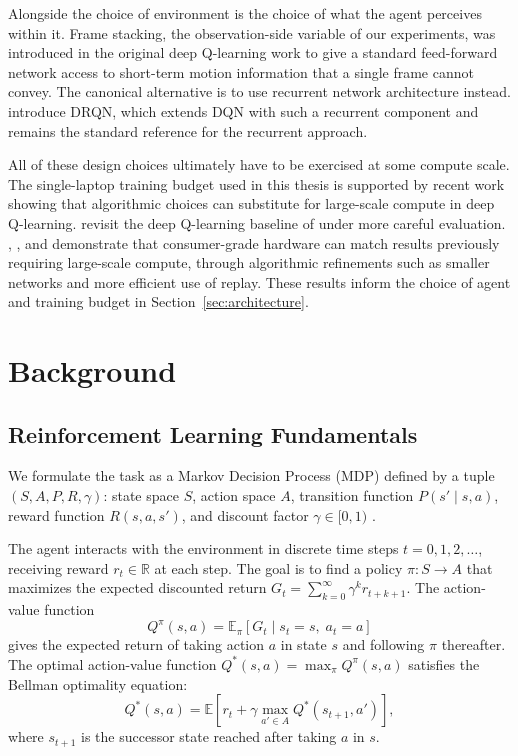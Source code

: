 \documentclass[12pt,a4paper,titlepage]{article}
\begin{document}
Alongside the choice of environment is the choice of what the agent perceives within it. Frame stacking, the observation-side variable of our experiments, was introduced in the original deep Q-learning work \citep{Mnih2013} to give a standard feed-forward network access to short-term motion information that a single frame cannot convey. The canonical alternative is to use recurrent network architecture instead. \citet{Hausknecht2015} introduce DRQN, which extends DQN with such a recurrent component and remains the standard reference for the recurrent approach.

All of these design choices ultimately have to be exercised at some compute scale. The single-laptop training budget used in this thesis is supported by recent work showing that algorithmic choices can substitute for large-scale compute in deep Q-learning. \citet{ObandoCeron2021} revisit the deep Q-learning baseline of \citet{Hessel2018} under more careful evaluation. \citet{Schwarzer2023}, \citet{ObandoCeron2023}, and \citet{Clark2024} demonstrate that consumer-grade hardware can match results previously requiring large-scale compute, through algorithmic refinements such as smaller networks and more efficient use of replay. These results inform the choice of agent and training budget in Section~\ref{sec:architecture}.

\section{Background}
\label{sec:background}

\subsection{Reinforcement Learning Fundamentals}

We formulate the task as a Markov Decision Process (MDP) defined by a tuple $(S, A, P, R, \gamma)$: state space $S$, action space $A$, transition function $P(s' \mid s, a)$, reward function $R(s, a, s')$, and discount factor $\gamma \in [0, 1)$ \citep{SuttonBarto2018}.

The agent interacts with the environment in discrete time steps $t = 0, 1, 2, \ldots$, receiving reward $r_t \in \mathbb{R}$ at each step. The goal is to find a policy $\pi: S \to A$ that maximizes the expected discounted return $G_t = \sum_{k=0}^{\infty} \gamma^k r_{t+k+1}$. The action-value function
\begin{equation}
Q^\pi(s, a) = \mathbb{E}_\pi\!\left[G_t \mid s_t = s,\; a_t = a\right]
\end{equation}
gives the expected return of taking action $a$ in state $s$ and following $\pi$ thereafter. The optimal action-value function $Q^*(s, a) = \max_\pi Q^\pi(s, a)$ satisfies the Bellman optimality equation:
\begin{equation}
Q^*(s, a) = \mathbb{E}\!\left[r_t + \gamma \max_{a'\in A} Q^*(s_{t+1}, a')\right],
\end{equation}
where $s_{t+1}$ is the successor state reached after taking $a$ in $s$.
\end{document}
